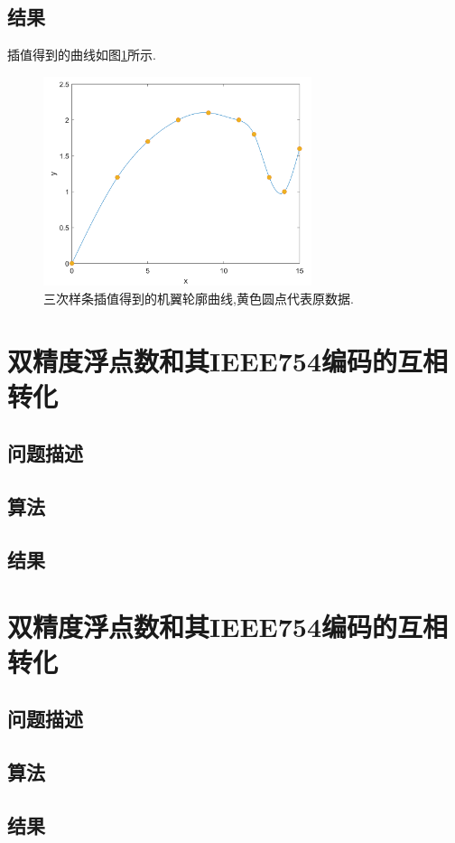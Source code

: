 \documentclass[UTF-8]{article}
\begin{document}
\subsection{结果}
插值得到的曲线如图\ref{fig:Q_4}所示.
\begin{figure}[h]
	\centering
	\includegraphics[width=0.7\textwidth]{Q_4.png}
	\caption{三次样条插值得到的机翼轮廓曲线,黄色圆点代表原数据.}
	\label{fig:Q_4}
\end{figure}
\section{双精度浮点数和其IEEE754编码的互相转化}
\subsection{问题描述}
\subsection{算法}
\subsection{结果}
\section{双精度浮点数和其IEEE754编码的互相转化}
\subsection{问题描述}
\subsection{算法}
\subsection{结果}
\end{document}

